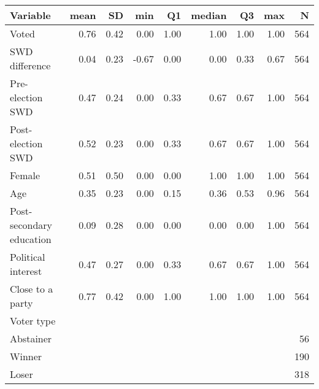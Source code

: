 
\begin{tabular}{l|r|r|r|r|r|r|r|r}
\hline
Variable & mean & SD & min & Q1 & median & Q3 & max & N\\
\hline
Voted & 0.76 & 0.42 & 0.00 & 1.00 & 1.00 & 1.00 & 1.00 & 564\\
\hline
SWD difference & 0.04 & 0.23 & -0.67 & 0.00 & 0.00 & 0.33 & 0.67 & 564\\
\hline
Pre-election SWD & 0.47 & 0.24 & 0.00 & 0.33 & 0.67 & 0.67 & 1.00 & 564\\
\hline
Post-election SWD & 0.52 & 0.23 & 0.00 & 0.33 & 0.67 & 0.67 & 1.00 & 564\\
\hline
Female & 0.51 & 0.50 & 0.00 & 0.00 & 1.00 & 1.00 & 1.00 & 564\\
\hline
Age & 0.35 & 0.23 & 0.00 & 0.15 & 0.36 & 0.53 & 0.96 & 564\\
\hline
Post-secondary education & 0.09 & 0.28 & 0.00 & 0.00 & 0.00 & 0.00 & 1.00 & 564\\
\hline
Political interest & 0.47 & 0.27 & 0.00 & 0.33 & 0.67 & 0.67 & 1.00 & 564\\
\hline
Close to a party & 0.77 & 0.42 & 0.00 & 1.00 & 1.00 & 1.00 & 1.00 & 564\\
\hline
Voter type &  &  &  &  &  &  &  & \\
\hline
Abstainer &  &  &  &  &  &  &  & 56\\
\hline
Winner &  &  &  &  &  &  &  & 190\\
\hline
Loser &  &  &  &  &  &  &  & 318\\
\hline
\end{tabular}
